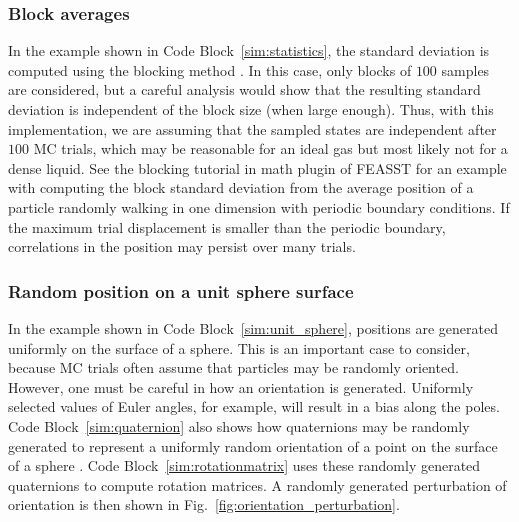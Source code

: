 \documentclass[
  9pt,
  bestpractices,
]{livecoms}
\begin{document}
\subsubsection{\label{sec:block_av}Block averages}

In the example shown in Code Block~\ref{sim:statistics}, the standard deviation is computed using the blocking method \cite{flyvbjerg_error_1989}.
In this case, only blocks of $100$ samples are considered, but a careful analysis would show that the resulting standard deviation is independent of the block size (when large enough).
Thus, with this implementation, we are assuming that the sampled states are independent after $100$ MC trials, which may be reasonable for an ideal gas but most likely not for a dense liquid.
See the blocking tutorial in math plugin of FEASST \cite{hatch_monte_2024} for an example with computing the block standard deviation from the average position of a particle randomly walking in one dimension with periodic boundary conditions.
If the maximum trial displacement is smaller than the periodic boundary, correlations in the position may persist over many trials.

\begin{figure}

\end{figure}

\subsubsection{\label{sec:unit_sphere}Random position on a unit sphere surface}

In the example shown in Code Block~\ref{sim:unit_sphere}, positions are generated uniformly on the surface of a sphere.
This is an important case to consider, because MC trials often assume that particles may be randomly oriented.
However, one must be careful in how an orientation is generated.
Uniformly selected values of Euler angles, for example, will result in a bias along the poles.
Code Block~\ref{sim:quaternion} also shows how quaternions may be randomly generated to represent a uniformly random orientation of a point on the surface of a sphere \cite{vesely_angular_1982}.
Code Block~\ref{sim:rotationmatrix} uses these randomly generated quaternions to compute rotation matrices.
A randomly generated perturbation of orientation is then shown in Fig.~\ref{fig:orientation_perturbation}.
\end{document}
